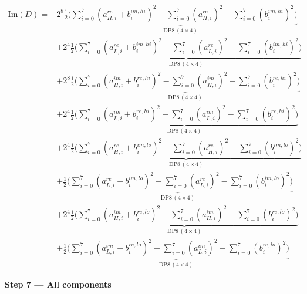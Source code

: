 \documentclass[fleqn]{article}
\newcommand{\DPop}[3]{\mathrm{DP#1}\,(#2\!\times\!#3)}
\begin{document}
\begin{align*}
\mathrm{Im}(D) = {}
  & 2^{8}\underbrace{\tfrac{1}{2}\Big(\sum_{i=0}^{7}(a_{H,i}^{re}{+}b_i^{im,hi})^2 - \sum_{i=0}^{7}(a_{H,i}^{re})^2 - \sum_{i=0}^{7}(b_i^{im,hi})^2\Big)}_{\DPop{8}{4}{4}} \\[0.2em]
  & + 2^{4}\underbrace{\tfrac{1}{2}\Big(\sum_{i=0}^{7}(a_{L,i}^{re}{+}b_i^{im,hi})^2 - \sum_{i=0}^{7}(a_{L,i}^{re})^2 - \sum_{i=0}^{7}(b_i^{im,hi})^2\Big)}_{\DPop{8}{4}{4}} \\[0.2em]
  & + 2^{8}\underbrace{\tfrac{1}{2}\Big(\sum_{i=0}^{7}(a_{H,i}^{im}{+}b_i^{re,hi})^2 - \sum_{i=0}^{7}(a_{H,i}^{im})^2 - \sum_{i=0}^{7}(b_i^{re,hi})^2\Big)}_{\DPop{8}{4}{4}} \\[0.2em]
  & + 2^{4}\underbrace{\tfrac{1}{2}\Big(\sum_{i=0}^{7}(a_{L,i}^{im}{+}b_i^{re,hi})^2 - \sum_{i=0}^{7}(a_{L,i}^{im})^2 - \sum_{i=0}^{7}(b_i^{re,hi})^2\Big)}_{\DPop{8}{4}{4}} \\[0.2em]
  & + 2^{4}\underbrace{\tfrac{1}{2}\Big(\sum_{i=0}^{7}(a_{H,i}^{re}{+}b_i^{im,lo})^2 - \sum_{i=0}^{7}(a_{H,i}^{re})^2 - \sum_{i=0}^{7}(b_i^{im,lo})^2\Big)}_{\DPop{8}{4}{4}} \\[0.2em]
  & + \underbrace{\tfrac{1}{2}\Big(\sum_{i=0}^{7}(a_{L,i}^{re}{+}b_i^{im,lo})^2 - \sum_{i=0}^{7}(a_{L,i}^{re})^2 - \sum_{i=0}^{7}(b_i^{im,lo})^2\Big)}_{\DPop{8}{4}{4}} \\[0.2em]
  & + 2^{4}\underbrace{\tfrac{1}{2}\Big(\sum_{i=0}^{7}(a_{H,i}^{im}{+}b_i^{re,lo})^2 - \sum_{i=0}^{7}(a_{H,i}^{im})^2 - \sum_{i=0}^{7}(b_i^{re,lo})^2\Big)}_{\DPop{8}{4}{4}} \\[0.2em]
  & + \underbrace{\tfrac{1}{2}\Big(\sum_{i=0}^{7}(a_{L,i}^{im}{+}b_i^{re,lo})^2 - \sum_{i=0}^{7}(a_{L,i}^{im})^2 - \sum_{i=0}^{7}(b_i^{re,lo})^2\Big)}_{\DPop{8}{4}{4}}
\end{align*}

\textbf{Step 7 --- All components}
\end{document}

